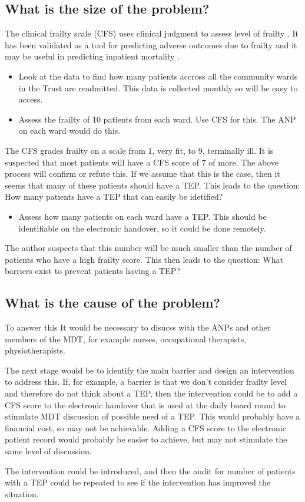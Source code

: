 \documentclass[12pt,a4paper,oneside,titlepage]{article}
\begin{document}
\subsection*{What is the size of the problem?}
The clinical frailty scale (CFS) uses clinical judgment to assess level of frailty
\parencite{dalhousie:15}. It has been validated as a tool for predicting adverse
outcomes due to frailty \parencite{rockwood:05} and it may be useful in predicting
inpatient mortality \parencite{wallis:15}.

\begin{itemize}
\item Look at the data to find how many patients accross all the community wards in the
    Trust are readmitted. This data is collected monthly so will be easy to access.
\item Assess the frailty of 10 patients from each ward. Use CFS for this.
	The ANP on each ward would do this.
\end{itemize}

The CFS grades frailty on a scale from 1, very fit, to 9, terminally ill.
It is suspected that most patients will have a CFS score of 7 of more. The above process 
will confirm or refute this. If we assume that this is the case, then it seems
that many of these patients should have a TEP. This leads to the question: 
How many patients have a TEP that can easily be idetified?

\begin{itemize}

\item Assess how many patients on each ward have a TEP. This should be identifiable on 
	the electronic handover, so it could be done remotely.
\end{itemize}

The author suspects that this number will be much smaller than the number of patients 
who have a high frailty score. This then leads to the question: 
What barriers exist to prevent patients having a TEP?

\subsection*{What is the cause of the problem?}
To answer this It would be necessary to disucss with the ANPs and other members of
the MDT, for example nurses, occupational therapists, physiotherapists.

The next stage would be to identify the main barrier and design an intervention to
address this. If, for example, a barrier is that we don't consider frailty level and
therefore do not think about a TEP, then the intervention could be to add a CFS score
to the electronic handover that is used at the daily board round to stimulate MDT
discussion of possible need of a TEP. This would probably have a financial cost, so
may not be achievable. Adding a CFS score to the electronic patient record would 
probably be easier to achieve, but may not stimulate the same level of discussion.


The intervention could be introduced, and then the audit for number of patients with 
a TEP could be repeated to see if the intervention has improved the situation.

\clearpage
\printbibliography[prenote=needsfixing]
\end{document}

